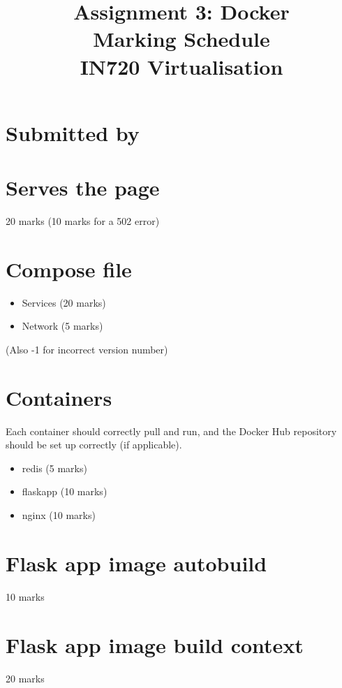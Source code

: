 \documentclass{article}
\begin{document}
\title{Assignment 3: Docker \\ Marking Schedule\\IN720 Virtualisation}
\date{}
\maketitle

\section*{Submitted by}

 \vspace{20mm}
 
\section{Serves the page}
  20 marks (10 marks for a 502 error)
 \vspace{20mm}
 
 \section{Compose file}
   \begin{itemize}
     \item Services (20 marks)
     \item Network (5 marks)
\end{itemize}     
     (Also -1 for incorrect version number)
    \vspace{20mm}
        
     
\section{Containers}
Each container should correctly pull and run, and the Docker Hub repository should be set
up correctly (if applicable).

\begin{itemize}
  \item redis (5 marks)
  \item flaskapp (10 marks)
  \item nginx (10 marks)
\end{itemize}
    \vspace{20mm}
    
\section{Flask app image autobuild}
10 marks
 \vspace{10mm}
 
\section{Flask app image build context}
20 marks

    
\end{document}
